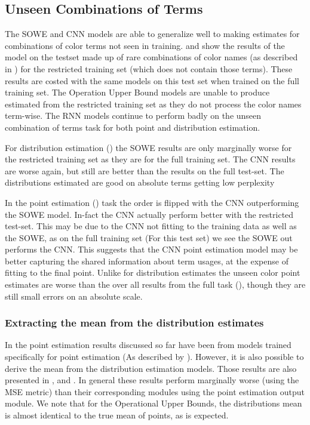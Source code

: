 \documentclass[11pt,a4paper]{article}
\begin{document}
\subsection{Unseen Combinations of Terms}
The SOWE and CNN models are able to generalize well to making estimates for combinations of color terms not seen in training.
 and  show the results of the model on the testset made up of rare combinations of color names (as described in ) for the restricted training set (which does not contain those terms).
These results are costed with the same models on this test set when trained on the full training set.
The Operation Upper Bound models are unable to produce estimated from the restricted training set as they do not process the color names term-wise.
The RNN models continue to perform badly on the unseen combination of terms task for both point and distribution estimation.

For distribution estimation () the SOWE results are only marginally worse for the restricted training set as they are for the full training set.
The CNN results are worse again, but still are better than the results on the full test-set.
The distributions estimated are good on absolute terms getting low perplexity

In the point estimation () task the order is flipped with the CNN outperforming the SOWE model.
In-fact the CNN actually perform better with the restricted test-set.
This may be due to the CNN not fitting to the training data as well as the SOWE,
as on the full training set (For this test set) we see the SOWE out performs the CNN.
This suggests that the CNN point estimation model may be better capturing the shared information about term usages, at the expense of fitting to the final point.
Unlike for distribution estimates the unseen color point estimates are worse than the over all results from the full task (), though they are still small errors on an absolute scale.



\subsubsection{Extracting the mean from the distribution estimates}

In the point estimation results discussed so far have been from models trained specifically for point estimation (As described by ).
However, it is also possible to derive the mean from the distribution estimation models.
Those results are also presented in ,  and .
In general these results perform marginally worse (using the MSE metric) than their corresponding modules using the point estimation output module.
We note that for the Operational Upper Bounds, the distributions mean is almost identical to the true mean of points, as is expected.
\end{document}

